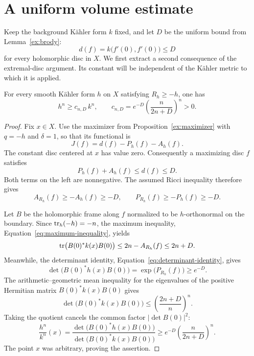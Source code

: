 \section{A uniform volume estimate}
\label{sec:volume}

Keep the background K\"ahler form $k$ fixed, and let $D$ be the
uniform bound from Lemma~\ref{ex:brody}:
\[
 d(f)=k\bigl(f'(0),f'(0)\bigr)\le D
\]
for every holomorphic disc in $X$.  We first extract a second consequence
of the extremal-disc argument.  Its constant will be independent of the
K\"ahler metric to which it is applied.

\begin{proposition}
\label{prop:volume-lower-bound}
For every smooth K\"ahler form $h$ on $X$ satisfying
$R_h\ge-h$, one has
\begin{equation}
\label{eq:uniform-volume-lower-bound}
 h^n\ge c_{n,D}\,k^n,
 \qquad
 c_{n,D}=e^{-D}\left(\frac{n}{2n+D}\right)^n>0.
\end{equation}
\end{proposition}

\begin{proof}
Fix $x\in X$.  Use the maximizer from Proposition~\ref{ex:maximizer} with
$q=-h$ and $\delta=1$, so that its functional is
\[
 J(f)=d(f)-P_h(f)-A_h(f).
\]
The constant disc centered at $x$ has value zero.  Consequently a
maximizing disc $f$ satisfies
\begin{equation}
\label{eq:volume-extremal-energy}
 P_h(f)+A_h(f)\le d(f)\le D.
\end{equation}
Both terms on the left are nonnegative.  The assumed Ricci inequality
therefore gives
\[
 A_{R_h}(f)\ge-A_h(f)\ge-D,
 \qquad
 P_{R_h}(f)\ge-P_h(f)\ge-D.
\]

Let $B$ be the holomorphic frame along $f$ normalized to be
$h$-orthonormal on the boundary.  Since $\operatorname{tr}_h(-h)=-n$, the
maximum inequality, Equation~\eqref{eq:maximum-inequality}, yields
\[
 \operatorname{tr}\bigl(B(0)^*k(x)B(0)\bigr)
 \le 2n-A_{R_h}(f)\le2n+D.
\]
Meanwhile, the determinant identity,
Equation~\eqref{eq:determinant-identity}, gives
\[
 \det\bigl(B(0)^*h(x)B(0)\bigr)
 =\exp\bigl(P_{R_h}(f)\bigr)\ge e^{-D}.
\]
The arithmetic--geometric mean inequality for the eigenvalues of the
positive Hermitian matrix $B(0)^*k(x)B(0)$ gives
\[
 \det\bigl(B(0)^*k(x)B(0)\bigr)
 \le\left(\frac{2n+D}{n}\right)^n.
\]
Taking the quotient cancels the common factor $|\det B(0)|^2$:
\[
 \frac{h^n}{k^n}(x)
 =\frac{\det\bigl(B(0)^*h(x)B(0)\bigr)}
        {\det\bigl(B(0)^*k(x)B(0)\bigr)}
 \ge e^{-D}\left(\frac{n}{2n+D}\right)^n.
\]
The point $x$ was arbitrary, proving the assertion.
\end{proof}

